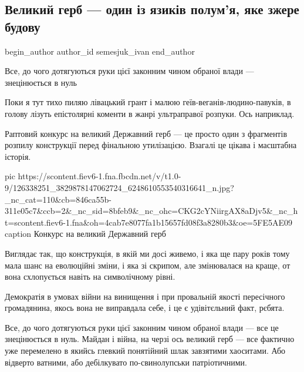  
 
 
 
 
\subsection{Великий герб --- один із язиків полум'я, яке зжере будову}
\label{sec:20_11_2020.news.ua.gazeta.semesjuk_ivan.1.gerb}
\ifcmt
	begin_author
   author_id semesjuk_ivan
	end_author
\fi

\begin{center}
  \begin{fminipage}{0.7\textwidth}
		\color{yellow}
		Все, до чого дотягуються руки цієї законним чином обраної влади --- знецінюється в нуль
  \end{fminipage}
\end{center}
  
Поки я тут тихо пиляю лівацький грант і малюю геїв-веганів-людино-павуків, в
голову лізуть епістолярні коменти в жанрі ультраправої розпуки. Ось наприклад.

Раптовий конкурс на великий Державний герб --- це просто один з фрагментів
розпилу конструкції перед фінальною утилізацією. Взагалі це цікава і масштабна
історія.

\ifcmt
pic https://scontent.fiev6-1.fna.fbcdn.net/v/t1.0-9/126338251_3829878147062724_6248610553540316641_n.jpg?_nc_cat=110&cb=846ca55b-311e05c7&ccb=2&_nc_sid=8bfeb9&_nc_ohc=CKG2cYNiirgAX8aDjv5&_nc_ht=scontent.fiev6-1.fna&oh=4cab7e8077fa1b15657fd08f3a8280b3&oe=5FE5AE09
caption Конкурс на великий Державний герб
\fi

Виглядає так, що конструкція, в якій ми досі живемо, і яка ще пару років тому
мала шанс на еволюційні зміни, і яка зі скрипом, але змінювалася на краще, от
вона схлопується навіть на символічному рівні.

Демократія в умовах війни на винищення і при провальній якості пересічного
громадянина, якось вона не виправдала себе, і це є удівітєльний факт, рєбята.

Все, до чого дотягуються руки цієї законним чином обраної влади --- все це
знецінюється в нуль. Майдан і війна, на черзі ось великий герб --- все фактично
уже перемелено в якийсь глевкий понятійний шлак завзятими хаоситами. Або
відверто ватними, або дебілкувато по-свинолупськи патріотичними.

